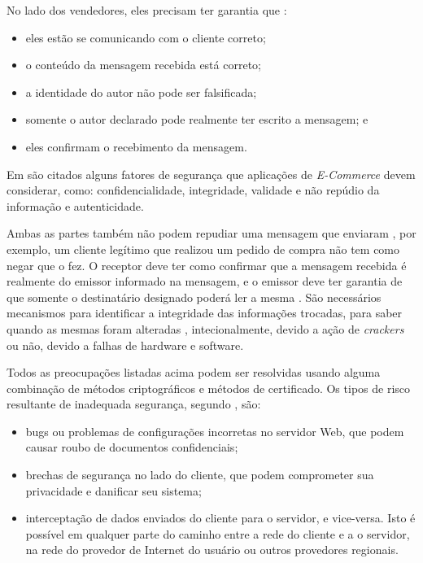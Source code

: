 No lado dos vendedores, eles precisam ter garantia que \cite{al2008commerce}:

\begin{itemize}
	\item eles estão se comunicando com o cliente correto;
	\item o conteúdo da mensagem recebida está correto;
	\item a identidade do autor não pode ser falsificada;
	\item somente o autor declarado pode realmente ter escrito a mensagem; e
	\item eles confirmam o recebimento da mensagem.
\end{itemize}

Em \cite{jiang2007line} são citados alguns fatores de segurança que aplicações de \textit{E-Commerce} devem considerar, como: confidencialidade, integridade, validade e não repúdio da informação e autenticidade.

Ambas as partes também não podem repudiar uma mensagem que enviaram \cite{jiang2007line}, por exemplo, um cliente legítimo que realizou um pedido de compra não tem como negar que o fez. O receptor deve ter como confirmar que a mensagem recebida é realmente do emissor informado na mensagem, e o emissor deve ter garantia de que somente o destinatário designado poderá ler a mesma \cite{jiang2007line}. São necessários mecanismos para identificar a integridade das informações trocadas, para saber quando as mesmas foram alteradas \cite{jiang2007line}, intecionalmente, devido a ação de \textit{crackers} ou não, devido a falhas de hardware e software.

Todos as preocupações listadas acima podem ser resolvidas usando alguma combinação de métodos criptográficos e métodos de certificado. Os tipos de risco resultante de inadequada segurança, segundo \cite{al2008commerce}, são:

\begin{itemize}
	\item bugs ou problemas de configurações incorretas no servidor Web, que podem causar roubo de documentos confidenciais;
	\item brechas de segurança no lado do cliente, que podem comprometer sua privacidade e danificar seu sistema;
	\item interceptação de dados enviados do cliente para o servidor, e vice-versa. Isto é possível em qualquer parte do caminho entre a rede do cliente e a o servidor, na rede do provedor de Internet do usuário ou outros provedores regionais.
\end{itemize}

